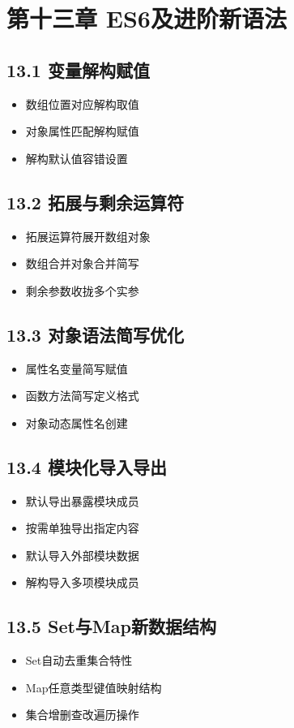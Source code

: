 \section{第十三章 ES6及进阶新语法}
\subsection{13.1 变量解构赋值}
\begin{itemize}
\item 数组位置对应解构取值
\item 对象属性匹配解构赋值
\item 解构默认值容错设置
\end{itemize}

\subsection{13.2 拓展与剩余运算符}
\begin{itemize}
\item 拓展运算符展开数组对象
\item 数组合并对象合并简写
\item 剩余参数收拢多个实参
\end{itemize}

\subsection{13.3 对象语法简写优化}
\begin{itemize}
\item 属性名变量简写赋值
\item 函数方法简写定义格式
\item 对象动态属性名创建
\end{itemize}

\subsection{13.4 模块化导入导出}
\begin{itemize}
\item 默认导出暴露模块成员
\item 按需单独导出指定内容
\item 默认导入外部模块数据
\item 解构导入多项模块成员
\end{itemize}

\subsection{13.5 Set与Map新数据结构}
\begin{itemize}
\item Set自动去重集合特性
\item Map任意类型键值映射结构
\item 集合增删查改遍历操作
\end{itemize}
